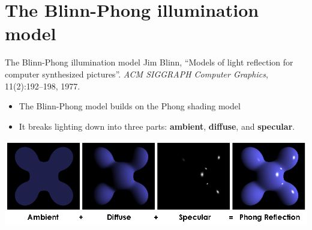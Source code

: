\part{The Blinn-Phong illumination model}
\frame{\partpage}

\begin{frame}{The Blinn-Phong illumination model}
	\pause Jim Blinn,
	``Models of light reflection for computer synthesized pictures''.
	\textit{ACM SIGGRAPH Computer Graphics},
	11(2):192--198,
	1977.
	
	\begin{itemize}
		\pause\item The Blinn-Phong model builds on the Phong shading model
		\pause\item It breaks lighting down into three parts: \textbf{ambient}, \textbf{diffuse}, and \textbf{specular}.
	\end{itemize}
	\pause\includegraphics[width=\textwidth]{phong}
\end{frame}

